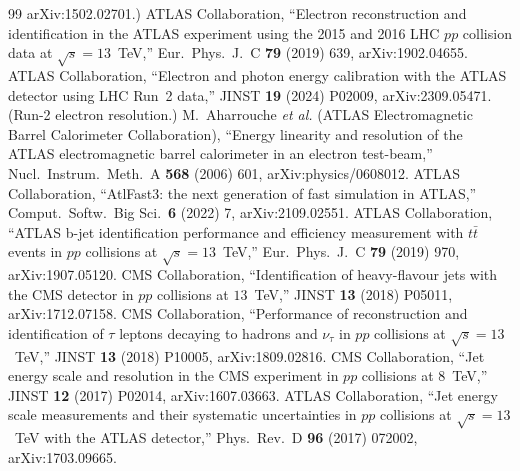 \documentclass[11pt,a4paper]{article}
\begin{document}
\begin{thebibliography}{99}
  arXiv:1502.02701.)
 ATLAS Collaboration, ``Electron reconstruction and
  identification in the ATLAS experiment using the 2015 and 2016 LHC $pp$
  collision data at $\sqrt{s}=13$~TeV,'' Eur.\ Phys.\ J.\ C \textbf{79} (2019)
  639, arXiv:1902.04655.
 ATLAS Collaboration, ``Electron and photon energy
  calibration with the ATLAS detector using LHC Run~2 data,'' JINST \textbf{19}
  (2024) P02009, arXiv:2309.05471. (Run-2 electron resolution.)
 M.~Aharrouche \emph{et al.} (ATLAS Electromagnetic Barrel
  Calorimeter Collaboration), ``Energy linearity and resolution of the ATLAS
  electromagnetic barrel calorimeter in an electron test-beam,'' Nucl.\ Instrum.\
  Meth.\ A \textbf{568} (2006) 601, arXiv:physics/0608012.
 ATLAS Collaboration, ``AtlFast3: the next generation of fast
  simulation in ATLAS,'' Comput.\ Softw.\ Big Sci.\ \textbf{6} (2022) 7,
  arXiv:2109.02551.
 ATLAS Collaboration, ``ATLAS b-jet identification
  performance and efficiency measurement with $t\bar t$ events in $pp$
  collisions at $\sqrt{s}=13$~TeV,'' Eur.\ Phys.\ J.\ C \textbf{79} (2019) 970,
  arXiv:1907.05120.
 CMS Collaboration, ``Identification of heavy-flavour jets with
  the CMS detector in $pp$ collisions at $13$~TeV,'' JINST \textbf{13} (2018)
  P05011, arXiv:1712.07158.
 CMS Collaboration, ``Performance of reconstruction and
  identification of $\tau$ leptons decaying to hadrons and $\nu_\tau$ in $pp$
  collisions at $\sqrt{s}=13$~TeV,'' JINST \textbf{13} (2018) P10005,
  arXiv:1809.02816.
 CMS Collaboration, ``Jet energy scale and resolution in the CMS
  experiment in $pp$ collisions at $8$~TeV,'' JINST \textbf{12} (2017) P02014,
  arXiv:1607.03663.
 ATLAS Collaboration, ``Jet energy scale measurements and
  their systematic uncertainties in $pp$ collisions at $\sqrt{s}=13$~TeV with the
  ATLAS detector,'' Phys.\ Rev.\ D \textbf{96} (2017) 072002, arXiv:1703.09665.
\end{thebibliography}
\end{document}

